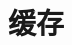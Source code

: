 \documentclass[../../interview-questions.tex]{subfiles}
\begin{document}
\section{缓存}


\end{document}
